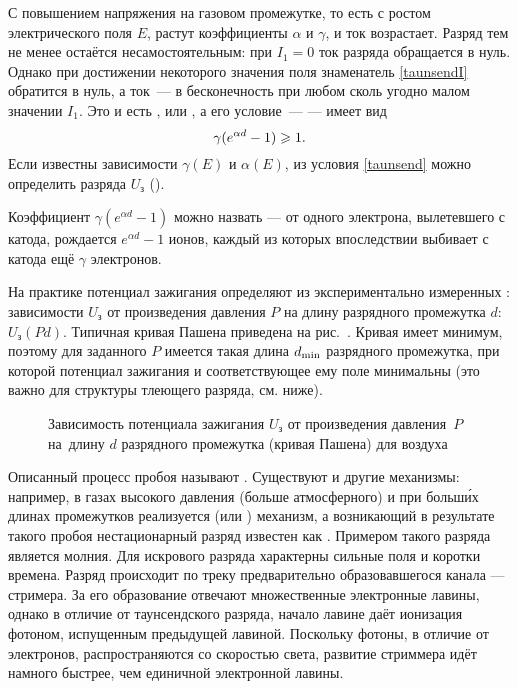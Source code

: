 С повышением напряжения на газовом промежутке, то есть с ростом электрического
поля $E$, растут коэффициенты $\alpha$ и $\gamma$, и ток возрастает.
Разряд тем не менее остаётся несамостоятельным: при $I_1=0$ ток разряда
обращается в нуль. Однако при достижении некоторого значения поля
знаменатель \eqref{taunsendI} обратится в нуль,
а ток~--- в бесконечность при любом сколь угодно малом значении $I_1$.
Это и есть , или , а его
условие~---  --- имеет вид
\begin{equation}
    \eqmark{taunsend}
	\gamma(e^{\alpha d}-1)\ge 1.
\end{equation}
Если известны зависимости $\gamma(E)$ и $\alpha(E)$, из условия \eqref{taunsend}
можно определить  разряда $U_{з}$
().

Коэффициент $\gamma (e^{\alpha d}-1)$ можно назвать
 --- от одного электрона,
вылетевшего с катода, рождается $e^{\alpha d}-1$ ионов,
каждый из которых впоследствии выбивает с катода ещё $\gamma$ электронов.

На практике потенциал зажигания определяют из экспериментально измеренных
: зависимости $U_{з}$ от произведения
давления $P$ на длину разрядного промежутка $d$: $U_{з}(Pd)$.
Типичная кривая Пашена приведена на рис.~.
Кривая имеет минимум, поэтому для заданного $P$ имеется такая длина
$d_{\rm min}$ разрядного промежутка,
при которой потенциал зажигания и соответствующее ему поле минимальны
(это важно для структуры тлеющего разряда, см. ниже).

\begin{figure}[h!]
	\centering
\footnotesize	{}
	\caption{Зависимость потенциала зажигания $U_\text{з}$ от произведения
давления~$P$ на~длину $d$ разрядного промежутка (кривая Пашена) для воздуха}
\end{figure}


Описанный процесс пробоя называют . Существуют и другие
механизмы: например, в газах высокого давления (больше атмосферного) и при
больш\'{и}х длинах промежутков реализуется 
(или ) механизм, а возникающий в результате такого пробоя
нестационарный разряд известен как . Примером такого разряда
является молния. Для искрового разряда характерны сильные поля и коротки времена.
Разряд происходит по треку предварительно образовавшегося
канала --- стримера. За его образование отвечают множественные электронные лавины,
однако в отличие от таунсендского разряда, начало лавине даёт ионизация
фотоном, испущенным предыдущей лавиной. Поскольку фотоны, в отличие
от электронов, распространяются со скоростью света, развитие стриммера идёт
намного быстрее, чем единичной электронной лавины.

